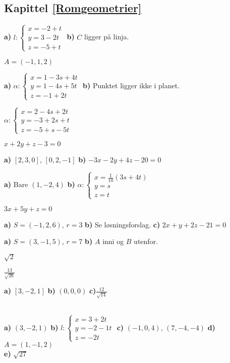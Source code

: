 



\subsection*{Kapittel \ref{Romgeometrier}}
\footnotesize
{} \textbf{a)} $ l: \left\lbrace{
	\begin{array}{l}
	x=-2 + t  \\
	y= 3-2t   \\
	z= -5+t 
	\end{array}
}\right. $ \textbf{b)} $ C $ ligger på linja.

 $ A=(-1, 1, 2) $

 \textbf{a)} $ \alpha: \left\lbrace{
	\begin{array}{l}
	x=1-3s+4t \\
	y=1-4s+5t \\
	z=-1 +2t
	\end{array}
}\right.  $ \textbf{b)} Punktet ligger ikke i planet.

 $ \alpha: \left\lbrace{
	\begin{array}{l}
	x=2-4s+2t \\
	y=-3+2s+t \\
	z=-5+s -5t
	\end{array}
}\right.  $

 $ x+2y+z-3=0 $

 \textbf{a)} $ [2, 3, 0] $, $ [0, 2, -1] $ \textbf{b)} $ -3x -2y+4z -20=0  $

\textbf{a)} Bare $ (1, -2, 4) $
\textbf{b)}
$ \alpha: \left\lbrace{
	\begin{array}{l}
	x=\frac{1}{10}(3s+4t) \\
	y=s \\
	z=t
	\end{array}
}\right.  $

 $ 3x+5y + z = 0 $

\textbf{a)} $ S=(-1, 2, 6) $, $ r=3 $ \textbf{b)} Se løsningsforslag. 
\textbf{c)} $ 2x + y + 2z - 21 =0$

\textbf{a)} $ S=(3, -1, 5) $, $ r=7 $ 
\textbf{b)} $ A $ inni og $ B $ utenfor.

 $ \sqrt{2} $

 $ \frac{13}{\sqrt{26}} $

 \textbf{a)} $ [3, -2, 1] $ \textbf{b)} $ (0, 0, 0) $ \textbf{c)}$ \frac{12}{\sqrt{14}} $

 \\
\textbf{a)} $ (3, -2, 1) $ \textbf{b) }$  l: \left\lbrace{
	\begin{array}{l}
	x=3+ 2t  \\
	y=-2-1t   \\
	z=-2t 
	\end{array}
}\right.  $  \textbf{c)} $ (-1, 0, 4) $, $ (7, -4, -4) $ \textbf{d)} $ A=(1, -1, 2) $\\
\textbf{e)} $ \sqrt{27} $
